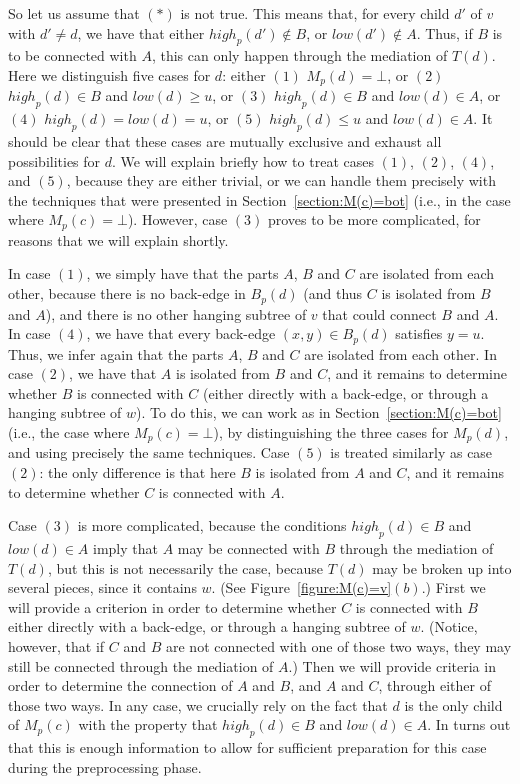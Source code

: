 \documentclass[11pt,a4paper]{article}
\begin{document}
So let us assume that $(*)$ is not true. This means that, for every child $d'$ of $v$ with $d'\neq d$, we have that either $\mathit{high}_p(d')\notin B$, or $\mathit{low}(d')\notin A$. Thus, if $B$ is to be connected with $A$, this can only happen through the mediation of $T(d)$. Here we distinguish five cases for $d$: either $(1)$ $M_p(d)=\bot$, or $(2)$ $\mathit{high}_p(d)\in B$ and $\mathit{low}(d)\geq u$, or $(3)$ $\mathit{high}_p(d)\in B$ and $\mathit{low}(d)\in A$, or $(4)$ $\mathit{high}_p(d)=\mathit{low}(d)=u$, or $(5)$ $\mathit{high}_p(d)\leq u $ and $\mathit{low}(d)\in A$. It should be clear that these cases are mutually exclusive and exhaust all possibilities for $d$. We will explain briefly how to treat cases $(1)$, $(2)$, $(4)$, and $(5)$, because they are either trivial, or we can handle them precisely with the techniques that were presented in Section~\ref{section:M(c)=bot} (i.e., in the case where $M_p(c)=\bot$). However, case $(3)$ proves to be more complicated, for reasons that we will explain shortly.

In case $(1)$, we simply have that the parts $A$, $B$ and $C$ are isolated from each other, because there is no back-edge in $B_p(d)$ (and thus $C$ is isolated from $B$ and $A$), and there is no other hanging subtree of $v$ that could connect $B$ and $A$. In case $(4)$, we have that every back-edge $(x,y)\in B_p(d)$ satisfies $y=u$. Thus, we infer again that the parts $A$, $B$ and $C$ are isolated from each other. In case $(2)$, we have that $A$ is isolated from $B$ and $C$, and it remains to determine whether $B$ is connected with $C$ (either directly with a back-edge, or through a hanging subtree of $w$). To do this, we can work as in Section~\ref{section:M(c)=bot} (i.e., the case where $M_p(c)=\bot$), by distinguishing the three cases for $M_p(d)$, and using precisely the same techniques. Case $(5)$ is treated similarly as case $(2)$: the only difference is that here $B$ is isolated from $A$ and $C$, and it remains to determine whether $C$ is connected with $A$.









Case $(3)$ is more complicated, because the conditions $\mathit{high}_p(d)\in B$ and $\mathit{low}(d)\in A$ imply that $A$ may be connected with $B$ through the mediation of $T(d)$, but this is not necessarily the case, because $T(d)$ may be broken up into several pieces, since it contains $w$. (See Figure~\ref{figure:M(c)=v}$(b)$.) First we will provide a criterion in order to determine whether $C$ is connected with $B$ either directly with a back-edge, or through a hanging subtree of $w$. (Notice, however, that if $C$ and $B$ are not connected with one of those two ways, they may still be connected through the mediation of $A$.) Then we will provide criteria in order to determine the connection of $A$ and $B$, and $A$ and $C$, through either of those two ways. In any case, we crucially rely on the fact that $d$ is the only child of $M_p(c)$ with the property that $\mathit{high}_p(d)\in B$ and $\mathit{low}(d)\in A$. In turns out that this is enough information to allow for sufficient preparation for this case during the preprocessing phase. 
\end{document}
